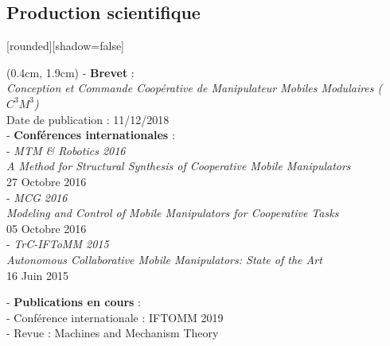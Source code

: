 \documentclass[french]{beamer}
\begin{document}
\subsection{Production scientifique}
\begin{frame}
[rounded][shadow=false]
{\scriptsize %
\begin{textblock*}{12cm}(0.4cm, 1.9cm)
- \textbf{Brevet} : \\
\textit{Conception et Commande Coopérative de Manipulateur Mobiles Modulaires ($C^3M^3$)}\\
Date de publication : 11/12/2018\\

\vspace{0.5cm}
- \textbf{Conférences internationales} :\\
\hspace{0.5cm} - \textit{MTM \& Robotics 2016}\\
\hspace{0.75cm} \textit{A Method for Structural Synthesis of Cooperative Mobile Manipulators}\\
\hspace{0.75cm} 27 Octobre 2016 \\

\vspace{0.25cm}
\hspace{0.5cm} - \textit{MCG 2016}\\
\hspace{0.75cm} \textit{Modeling and Control of Mobile Manipulators for Cooperative Tasks}\\
\hspace{0.75cm} 05 Octobre 2016 \\

\vspace{0.25cm}
\hspace{0.5cm} - \textit{TrC-IFToMM 2015}\\
\hspace{0.75cm} \textit{Autonomous Collaborative Mobile Manipulators: State of the Art}\\
\hspace{0.75cm} 16 Juin 2015

\vspace{0.5cm}
- \textbf{Publications en cours} :\\
\hspace{0.5cm} - Conférence internationale : IFTOMM 2019\\
\hspace{0.5cm} - Revue : Machines and Mechanism Theory
\end{textblock*}
}
\end{frame}
\end{document}
